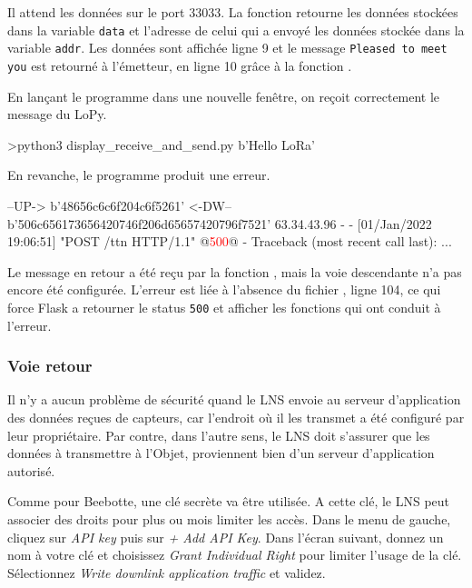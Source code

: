 Il attend les données sur le port 33033. La fonction  retourne les données stockées dans la variable \texttt{data} et l'adresse de celui qui a envoyé les données stockée dans la variable \texttt{addr}. Les données sont affichée ligne 9 et le message \texttt{Pleased to meet you} est retourné à l'émetteur, en ligne 10 grâce à la fonction .

         \vspace{1em}

En lançant le programme dans une nouvelle fenêtre, on reçoit correctement le message du LoPy.

\begin{termc}[backgroundcolor=\color{palerod}, basicstyle=\ttfamily\small, escapechar=@]
>python3 display_receive_and_send.py
b'Hello LoRa'
\end{termc}

En revanche, le programme  produit une erreur.

\begin{termc}[backgroundcolor=\color{palerod}, basicstyle=\ttfamily\small, escapechar=@]
--UP-> b'48656c6c6f204c6f5261'
<-DW-- b'506c656173656420746f206d65657420796f7521'
63.34.43.96 - - [01/Jan/2022 19:06:51] "POST /ttn HTTP/1.1" @\textcolor{red}{500}@ -
Traceback (most recent call last):
...
\end{termc}

Le message en retour a été reçu par la fonction \texttt{}, mais la voie descendante n'a pas encore été configurée. L'erreur est liée à l'absence du fichier , ligne 104, ce qui force Flask a retourner le status \texttt{500} et afficher les fonctions qui ont conduit à l'erreur.

\subsubsection{Voie retour}

Il n'y a aucun problème de sécurité quand le LNS envoie au serveur d'application des données reçues de capteurs, car l'endroit où il les transmet a été configuré par leur propriétaire. Par contre, dans l'autre sens, le LNS doit s'assurer que les données à transmettre à l'Objet, proviennent bien d'un serveur d'application autorisé.

Comme pour Beebotte, une clé secrète va être utilisée. A cette clé, le LNS peut associer des droits pour plus ou mois limiter les accès. Dans le menu de gauche, cliquez sur \textit{API key} puis sur \textit{+ Add API Key}. Dans l'écran suivant, donnez un nom à votre clé et choisissez \textit{Grant Individual Right} pour limiter l'usage de la clé. Sélectionnez \textit{Write downlink application traffic} et validez. 

